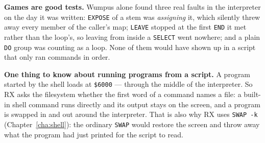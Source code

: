 \begin{aside}
\textbf{Games are good tests.} Wumpus alone found three real faults in
the interpreter on the day it was written: \verb|EXPOSE| of a stem was
\emph{assigning} it, which silently threw away every member of the
caller's map; \verb|LEAVE| stopped at the first \verb|END| it met rather
than the loop's, so leaving from inside a \verb|SELECT| went nowhere;
and a plain \verb|DO| group was counting as a loop. None of them would
have shown up in a script that only ran commands in order.
\end{aside}

\begin{aside}
\textbf{One thing to know about running programs from a script.} A
program started by the shell loads at \texttt{\$6000} --- through the
middle of the interpreter. So RX asks the filesystem whether the first
word of a command names a file: a built-in shell command runs directly
and its output stays on the screen, and a program is swapped in and out
around the interpreter. That is also why RX uses \verb|SWAP -k|
(Chapter~\ref{cha:shell}): the ordinary \verb|SWAP| would restore the
screen and throw away what the program had just printed for the script
to read.
\end{aside}
